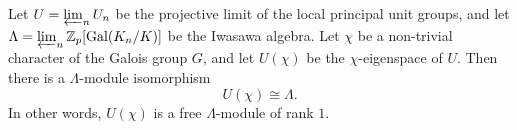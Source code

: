 Let $U = \varprojlim_n U_n$ be the projective limit of the local principal unit groups, and let $\Lambda = \varprojlim_n \mathbb{Z}_p[\mathrm{Gal}(K_n/K)]$ be the Iwasawa algebra. Let $\chi$ be a non-trivial character of the Galois group $G$, and let $U(\chi)$ be the $\chi$-eigenspace of $U$. Then there is a $\Lambda$-module isomorphism
$$U(\chi) \cong \Lambda.$$
In other words, $U(\chi)$ is a free $\Lambda$-module of rank $1$.
